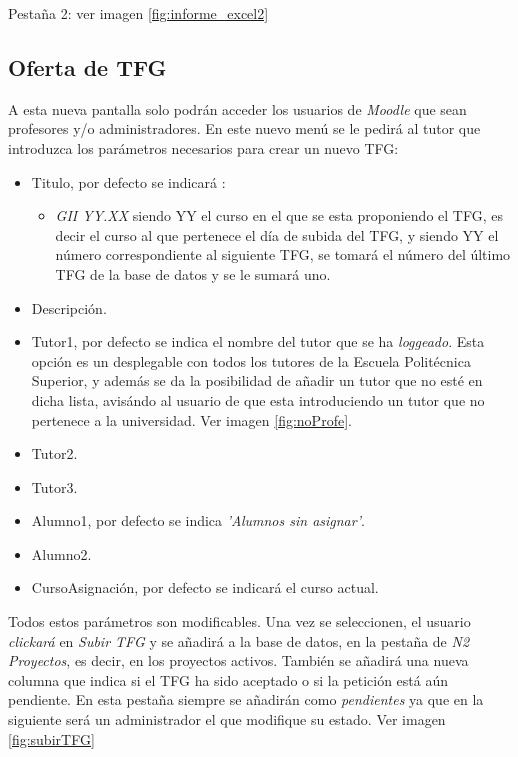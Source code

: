 Pestaña 2: ver imagen \ref{fig:informe_excel2}

\subsection{Oferta de TFG}

A esta nueva pantalla solo podrán acceder los usuarios de \emph{Moodle} que sean profesores y/o administradores.
En este nuevo menú se le pedirá al tutor que introduzca los parámetros necesarios para crear un nuevo TFG:

\begin{itemize}
	\item Titulo, por defecto se indicará :
	\begin{itemize}
		\item \emph{GII YY.XX} siendo YY el curso en el que se esta proponiendo el TFG, es decir el curso al que pertenece el día de subida del TFG, y siendo YY el número correspondiente al siguiente TFG, se tomará el número del último TFG de la base de datos y se le sumará uno.
	\end{itemize}
	\item Descripción.
	\item Tutor1, por defecto se indica el nombre del tutor que se ha \emph{loggeado}. Esta opción es un desplegable con todos los tutores de la Escuela Politécnica Superior, y además se da la posibilidad de añadir un tutor que no esté en dicha lista, avisándo al usuario de que esta introduciendo un tutor que no pertenece a la universidad. Ver imagen \ref{fig:noProfe}.
	\item Tutor2.
	\item Tutor3.
	\item Alumno1, por defecto se indica \emph{'Alumnos sin asignar'}.
	\item Alumno2.
	\item CursoAsignación, por defecto se indicará el curso actual.
\end{itemize}

Todos estos parámetros son modificables. Una vez se seleccionen, el usuario \emph{clickará} en \emph{Subir TFG} y se añadirá a la base de datos, en la pestaña de \emph{N2 Proyectos}, es decir, en los proyectos activos.
También se añadirá una nueva columna que indica si el TFG ha sido aceptado o si la petición está aún pendiente. En esta pestaña siempre se añadirán como \emph{pendientes} ya que en la siguiente será un administrador el que modifique su estado. Ver imagen \ref{fig:subirTFG}

